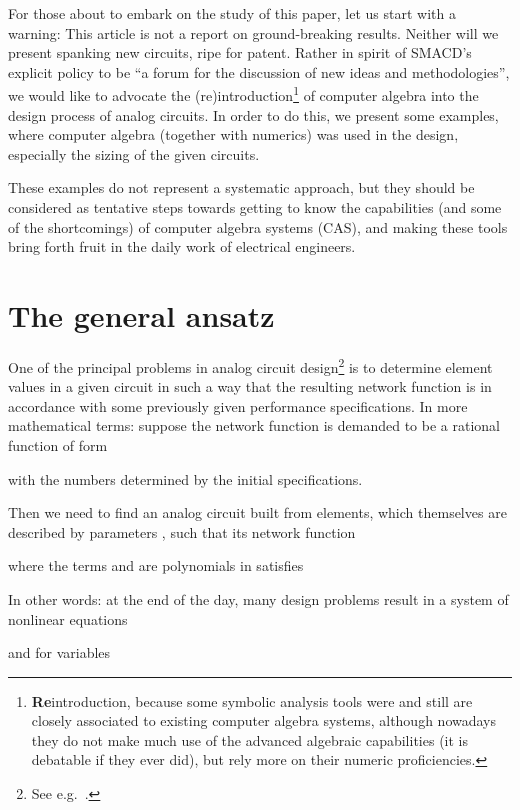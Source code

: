 \documentclass[10pt,twocolumn,pagenumbers]{IEEEtran}
\begin{document}
For those about to embark on the study of this paper, let us start with a warning: This article is not a report on ground-breaking results. Neither will we present spanking new circuits, ripe for patent. Rather in spirit of SMACD's explicit policy to be ``a forum for the discussion of new ideas and methodologies'', we would like to advocate the \hbox{(re)}\-introduction\footnote{{\bf Re}introduction, because some symbolic analysis tools were and still are closely associated to existing computer algebra systems, although nowadays they do not make much use of the advanced algebraic capabilities (it is debatable if they ever did), but rely more on their numeric proficiencies.} of computer algebra into the design process of analog circuits. In order to do this, we present some examples, where computer algebra (together with numerics) was used in the design, especially the sizing of the given circuits.

These examples do not represent a systematic approach, but they should be considered as tentative steps towards getting to know the capabilities (and some of the shortcomings) of computer algebra systems (CAS), and making these tools bring forth fruit in the daily work of electrical engineers. 

\section{The general ansatz}

\noindent 
One of the principal problems in analog circuit design\footnote{See e.g.\ \cite{GielenSansen}.} is to determine element values in a given circuit in such a way that the resulting network function is in accordance with some previously given performance specifications. In more mathematical terms: suppose the network function is demanded to be a rational function of form

\noindent
with the numbers    determined by the initial specifications. 

Then we need to find an analog circuit  built from elements, which themselves are described by parameters , such that its network function

\noindent
where the terms  and  are polynomials in 
satisfies

\noindent
In other words: at the end of the day, many design problems result in a system of nonlinear equations


\noindent
 and  for variables 
\end{document}
